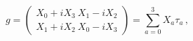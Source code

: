 \begin{equation}
g =
\left(\!\!
\begin{array}{c}
X_0 + i X_3 \ X_1 - i X_2 \\
X_1 + i X_2 \ X_0 - i X_3
\end{array}
\!\!\right)
= \sum_{a = 0}^3 X_a \tau_a
\, ,
\label{surface}
\end{equation}

